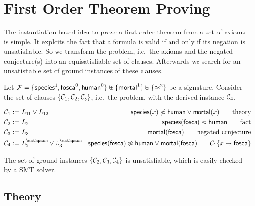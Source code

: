 
\chapter{First Order Theorem Proving}



The instantiation based idea to prove a first order theorem from a set of axioms is simple. 
It exploits the fact that a formula is valid if and only if its negation is unsatisfiable.
So we transform the problem, i.e.~the axioms and the negated conjecture(s) into an equisatisfiable set of clauses.
Afterwards we search for an unsatisfiable set of ground instances of these clauses.

\begin{example} Let ${\mathcal F} = \{\mathsf{species}^1, \mathsf{fosca}^0, \mathsf{human}^0 \} \uplus \{ \mathsf{mortal}^1  \} \uplus \{\approx^2\}$ be a signature. 
	Consider the set of clauses $\{ {\mathcal C}_1, {\mathcal C}_2, {\mathcal C}_3 \}$, i.e.~{\myem the problem}, with the derived instance ${\mathcal C}_4$.


\begin{align*}
\mcC_1 &:= L_{11}\lor L_{12}&\species(x)\mNE\human\lor\mortal(x) \tag*{theory}\\
\mcC_2 &:= L_2&\species(\fosca)\mEQ\human \tag*{fact} \\
\mcC_3 &:=L_3&\lnot\mortal(\fosca) \tag*{negated conjecture} \\
\mcC_4 &:=L_2^\mcc\lor L_3^\mcc&\species(\fosca)\mNE\human\lor\mortal(\fosca)\tag*{$\mcC_1 \{x\mapsto\fosca\}$}
\end{align*}

The set of ground instances $\{ {\mathcal C}_2, {\mathcal C}_3, {\mathcal C}_4  \}$ is unsatisfiable,
which is easily checked by a SMT solver.

\section{Theory}




\end{example}

